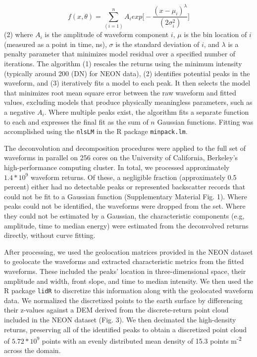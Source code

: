 \documentclass[
  12pt,
]{article}
\begin{document}
\[f(x,\theta) = \sum_{(i=1)}^{n} A_i exp\biggl[-\frac{(x-\mu_i)^\lambda}{(2\sigma_i^2)}\biggr]\]
(2) where \(A_i\) is the amplitude of waveform component \(i\), \(\mu\)
is the bin location of \(i\) (measured as a point in time, ns),
\(\sigma\) is the standard deviation of \(i\), and \(\lambda\) is a
penalty parameter that minimizes model residual over a specified number
of iterations. The algorithm (1) rescales the returns using the minimum
intensity (typically around 200 (DN) for NEON data), (2) identifies
potential peaks in the waveform, and (3) iteratively fits a model to
each peak. It then selects the model that minimizes root mean square
error between the raw waveform and fitted values, excluding models that
produce physically meaningless parameters, such as a negative \(A_i\).
Where multiple peaks exist, the algorithm fits a separate function to
each and expresses the final fit as the sum of \(n\) Gaussian functions.
Fitting was accomplished using the \texttt{nlsLM} in the R package
\texttt{minpack.lm}.

The deconvolution and decomposition procedures were applied to the full
set of waveforms in parallel on 256 cores on the University of
California, Berkeley's high-performance computing cluster. In total, we
processed approximately \(1.4*10^9\) waveform returns. Of these, a
negligible fraction (approximately 0.5 percent) either had no detectable
peaks or represented backscatter records that could not be fit to a
Gaussian function (Supplementary Material Fig. 1). Where peaks could not
be identified, the waveforms were dropped from the set. Where they could
not be estimated by a Gaussian, the characteristic components (e.g,
amplitude, time to median energy) were estimated from the deconvolved
returns directly, without curve fitting.

After processing, we used the geolocation matrices provided in the NEON
dataset to geolocate the waveforms and extracted characteristic metrics
from the fitted waveforms. These included the peaks' location in
three-dimensional space, their amplitude and width, front slope, and
time to median intensity. We then used the R package \texttt{lidR} to
discretize this information along with the geolocated waveform data. We
normalized the discretized points to the earth surface by differencing
their z-values against a DEM derived from the discrete-return point
cloud included in the NEON dataset (Fig. 3). We then decimated the
high-density returns, preserving all of the identified peaks to obtain a
discretized point cloud of \(5.72*10^9\) points with an evenly
distributed mean density of 15.3 points m\textsuperscript{-2} across the
domain.
\end{document}

